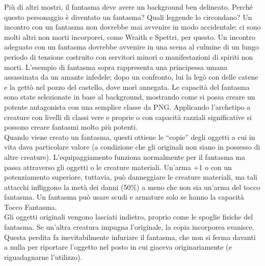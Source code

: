 \begin{multicols}{2}
Più di altri mostri, il fantasma deve avere un background ben delineato. Perché questo personaggio è diventato un fantasma? Quali leggende lo circondano? Un incontro con un fantasma non dovrebbe mai avvenire in modo accidentale: ci sono molti altri non morti incorporei, come Wraith e Spettri, per questo. Un incontro adeguato con un fantasma dovrebbe avvenire in una scena al culmine di un lungo periodo di tensione costruito con servitori minori o manifestazioni di spiriti non morti. L’esempio di fantasma sopra rappresenta una principessa umana assassinata da un amante infedele; dopo un confronto, lui la legò con delle catene e la gettò nel pozzo del castello, dove morì annegata. Le capacità del fantasma sono state selezionate in base al background, mostrando come si possa creare un potente antagonista con una semplice classe da PNG. Applicando l’archetipo a creature con livelli di classi vere e proprie o con capacità razziali significative si possono creare fantasmi molto più potenti.\\

Quando viene creato un fantasma, questi ottiene le “copie” degli oggetti a cui in vita dava particolare valore (a condizione che gli originali non siano in possesso di altre creature). L’equipaggiamento funziona normalmente per il fantasma ma passa attraverso gli oggetti o le creature materiali. Un’arma +1 o con un potenziamento superiore, tuttavia, può danneggiare le creature materiali, ma tali attacchi infliggono la metà dei danni (50\%) a meno che non sia un’arma del tocco fantasma. Un fantasma può usare scudi e armature solo se hanno la capacità Tocco Fantasma.\\

Gli oggetti originali vengono lasciati indietro, proprio come le spoglie fisiche del fantasma. Se un’altra creatura impugna l’originale, la copia incorporea svanisce. Questa perdita fa inevitabilmente infuriare il fantasma, che non si ferma davanti a nulla per riportare l’oggetto nel posto in cui giaceva originariamente (e riguadagnarne l’utilizzo).\\


\end{multicols}
